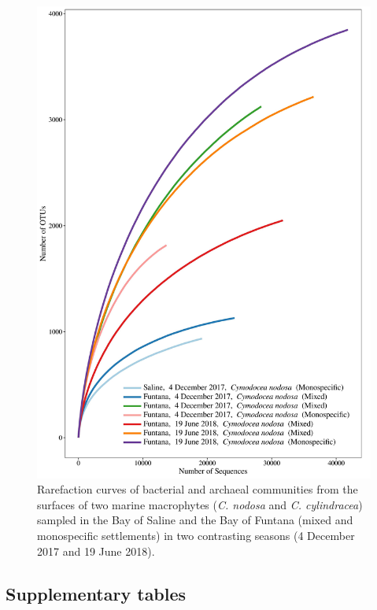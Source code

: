 \documentclass[12pt,]{article}
\begin{document}
\begin{figure}[H]

{\centering \includegraphics[width=0.8\linewidth]{../results/figures/rarefaction} 

}

\caption{Rarefaction curves of bacterial and archaeal communities from the surfaces of two marine macrophytes (\textit{C. nodosa} and \textit{C. cylindracea}) sampled in the Bay of Saline and the Bay of Funtana (mixed and monospecific settlements) in two contrasting seasons (4 December 2017 and 19 June 2018).\label{rarefaction}}\label{fig:unnamed-chunk-1}
\end{figure}

\newpage

\hypertarget{supplementary-tables}{%
\subsection{Supplementary tables}\label{supplementary-tables}}

\begingroup\fontsize{9}{11}\selectfont
\end{document}
